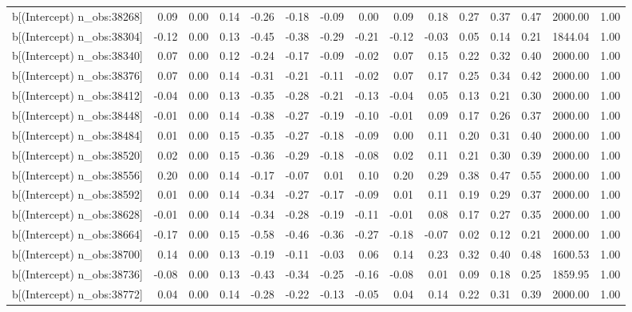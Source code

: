 \begin{table}[ht]
\begin{tabular}{rrrrrrrrrrrrrrr}
  b[(Intercept) n\_obs:38268] & 0.09 & 0.00 & 0.14 & -0.26 & -0.18 & -0.09 & 0.00 & 0.09 & 0.18 & 0.27 & 0.37 & 0.47 & 2000.00 & 1.00 \\ 
  b[(Intercept) n\_obs:38304] & -0.12 & 0.00 & 0.13 & -0.45 & -0.38 & -0.29 & -0.21 & -0.12 & -0.03 & 0.05 & 0.14 & 0.21 & 1844.04 & 1.00 \\ 
  b[(Intercept) n\_obs:38340] & 0.07 & 0.00 & 0.12 & -0.24 & -0.17 & -0.09 & -0.02 & 0.07 & 0.15 & 0.22 & 0.32 & 0.40 & 2000.00 & 1.00 \\ 
  b[(Intercept) n\_obs:38376] & 0.07 & 0.00 & 0.14 & -0.31 & -0.21 & -0.11 & -0.02 & 0.07 & 0.17 & 0.25 & 0.34 & 0.42 & 2000.00 & 1.00 \\ 
  b[(Intercept) n\_obs:38412] & -0.04 & 0.00 & 0.13 & -0.35 & -0.28 & -0.21 & -0.13 & -0.04 & 0.05 & 0.13 & 0.21 & 0.30 & 2000.00 & 1.00 \\ 
  b[(Intercept) n\_obs:38448] & -0.01 & 0.00 & 0.14 & -0.38 & -0.27 & -0.19 & -0.10 & -0.01 & 0.09 & 0.17 & 0.26 & 0.37 & 2000.00 & 1.00 \\ 
  b[(Intercept) n\_obs:38484] & 0.01 & 0.00 & 0.15 & -0.35 & -0.27 & -0.18 & -0.09 & 0.00 & 0.11 & 0.20 & 0.31 & 0.40 & 2000.00 & 1.00 \\ 
  b[(Intercept) n\_obs:38520] & 0.02 & 0.00 & 0.15 & -0.36 & -0.29 & -0.18 & -0.08 & 0.02 & 0.11 & 0.21 & 0.30 & 0.39 & 2000.00 & 1.00 \\ 
  b[(Intercept) n\_obs:38556] & 0.20 & 0.00 & 0.14 & -0.17 & -0.07 & 0.01 & 0.10 & 0.20 & 0.29 & 0.38 & 0.47 & 0.55 & 2000.00 & 1.00 \\ 
  b[(Intercept) n\_obs:38592] & 0.01 & 0.00 & 0.14 & -0.34 & -0.27 & -0.17 & -0.09 & 0.01 & 0.11 & 0.19 & 0.29 & 0.37 & 2000.00 & 1.00 \\ 
  b[(Intercept) n\_obs:38628] & -0.01 & 0.00 & 0.14 & -0.34 & -0.28 & -0.19 & -0.11 & -0.01 & 0.08 & 0.17 & 0.27 & 0.35 & 2000.00 & 1.00 \\ 
  b[(Intercept) n\_obs:38664] & -0.17 & 0.00 & 0.15 & -0.58 & -0.46 & -0.36 & -0.27 & -0.18 & -0.07 & 0.02 & 0.12 & 0.21 & 2000.00 & 1.00 \\ 
  b[(Intercept) n\_obs:38700] & 0.14 & 0.00 & 0.13 & -0.19 & -0.11 & -0.03 & 0.06 & 0.14 & 0.23 & 0.32 & 0.40 & 0.48 & 1600.53 & 1.00 \\ 
  b[(Intercept) n\_obs:38736] & -0.08 & 0.00 & 0.13 & -0.43 & -0.34 & -0.25 & -0.16 & -0.08 & 0.01 & 0.09 & 0.18 & 0.25 & 1859.95 & 1.00 \\ 
  b[(Intercept) n\_obs:38772] & 0.04 & 0.00 & 0.14 & -0.28 & -0.22 & -0.13 & -0.05 & 0.04 & 0.14 & 0.22 & 0.31 & 0.39 & 2000.00 & 1.00 \\ 

\end{tabular}
\end{table}
